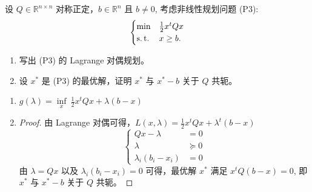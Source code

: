 \begin{Problem}
    设 $Q \in \mathbb{R}^{n \times n}$ 对称正定，$b \in \mathbb{R}^n$ 且 $b\neq 0$, 考虑非线性规划问题 (P3):
    \[\begin{cases}
        \min &\frac{1}{2}x^tQx\\
        \operatorname{s.t.} &x \ge b.
    \end{cases}\]
    \begin{enumerate}
        \item 写出 (P3) 的 Lagrange 对偶规划。
        \item 设 $x^*$ 是 (P3) 的最优解，证明 $x^*$ 与 $x^* - b$ 关于 $Q$ 共轭。
    \end{enumerate}

    \Answer \text{} \begin{enumerate}
        \item $g(\lambda) = \underset{x}{\inf}\ \frac{1}{2}x^tQx + \lambda(b - x)$
        \item \begin{proof}
            由 Lagrange 对偶可得，$L(x, \lambda) = \frac{1}{2}x^tQx + \lambda^t(b - x)$
            \[\begin{cases}
                Qx - \lambda &= 0\\
                \lambda &\succeq 0\\
                \lambda_i(b_i - x_i) &= 0
            \end{cases}\]
            由 $\lambda = Qx$ 以及 $\lambda_i(b_i - x_i) = 0$ 可得，最优解 $x^*$ 满足 $x^tQ(b - x) = 0$, 即 $x^*$ 与 $x^* - b$ 关于 $Q$ 共轭。
        \end{proof}
    \end{enumerate}
\end{Problem}

